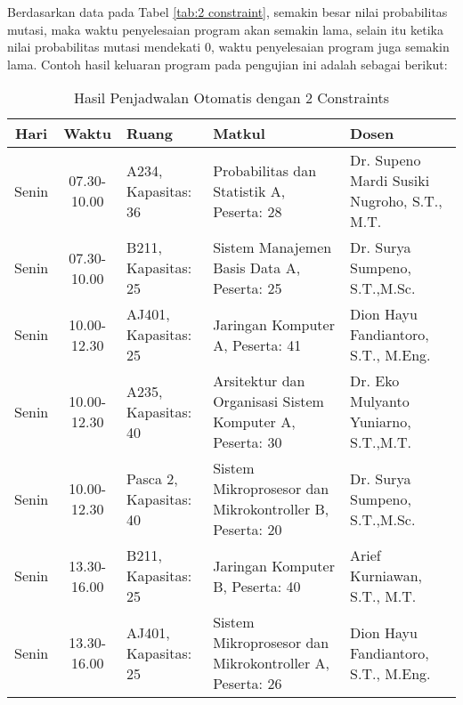 Berdasarkan data pada Tabel \ref{tab:2 constraint}, semakin besar nilai probabilitas mutasi, maka waktu penyelesaian program akan semakin lama, selain itu ketika nilai probabilitas mutasi mendekati 0, waktu penyelesaian program juga semakin lama.
Contoh hasil keluaran program pada pengujian ini adalah sebagai berikut:
\begin{longtable}[c]{|c|c|>{\centering\arraybackslash}m{2.5cm}|>{\centering\arraybackslash}m{4cm}|>{\centering\arraybackslash}m{3cm}|}
  \caption{Hasil Penjadwalan Otomatis dengan 2 Constraints}
  \label{tab:2}\\
  \hline
  \rowcolor[HTML]{C0C0C0} 
  Hari   & Waktu       & Ruang                  & Matkul                                                              & Dosen                                         \\ \hline
  Senin  & 07.30-10.00 & A234, Kapasitas: 36    & Probabilitas dan Statistik A, \linebreak Peserta: 28                & Dr. Supeno Mardi Susiki Nugroho, S.T., M.T.   \\ \hline
  Senin  & 07.30-10.00 & B211, Kapasitas: 25    & Sistem Manajemen Basis Data A, \linebreak Peserta: 25               & Dr. Surya Sumpeno, S.T.,M.Sc.                 \\ \hline
  Senin  & 10.00-12.30 & AJ401, Kapasitas: 25   & Jaringan Komputer A, \linebreak Peserta: 41                         & Dion Hayu Fandiantoro, S.T., M.Eng.           \\ \hline
  Senin  & 10.00-12.30 & A235, Kapasitas: 40    & Arsitektur dan Organisasi Sistem Komputer A, \linebreak Peserta: 30 & Dr. Eko Mulyanto Yuniarno, S.T.,M.T.          \\ \hline
  Senin  & 10.00-12.30 & Pasca 2, Kapasitas: 40 & Sistem Mikroprosesor dan Mikrokontroller B, \linebreak Peserta: 20  & Dr. Surya Sumpeno, S.T.,M.Sc.                 \\ \hline
  Senin  & 13.30-16.00 & B211, Kapasitas: 25    & Jaringan Komputer B, \linebreak Peserta: 40                         & Arief Kurniawan, S.T., M.T.                   \\ \hline
  Senin  & 13.30-16.00 & AJ401, Kapasitas: 25   & Sistem Mikroprosesor dan Mikrokontroller A, \linebreak Peserta: 26  & Dion Hayu Fandiantoro, S.T., M.Eng.           \\ \hline

\end{longtable}
